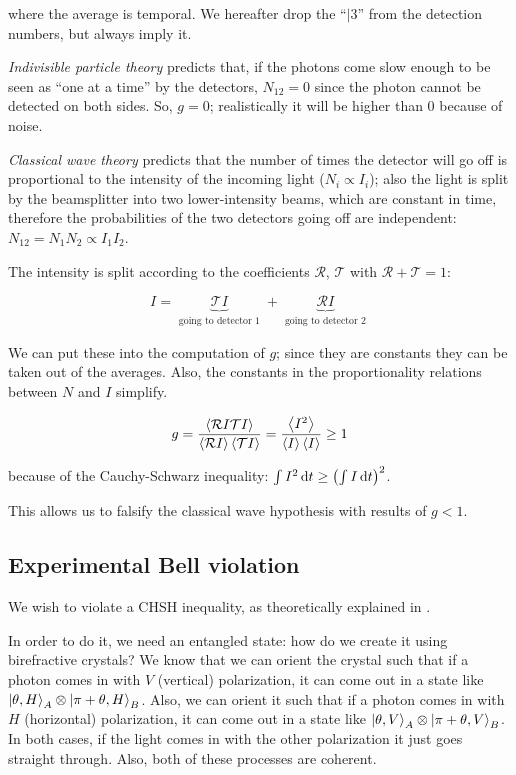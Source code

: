 \documentclass[main.tex]{subfiles}
\begin{document}
where the average is temporal. We hereafter drop the ``\(|3\)'' from the detection numbers, but always imply it.

\emph{Indivisible particle theory} predicts that, if the photons come slow enough to be seen as ``one at a time'' by the detectors, \(N_{12} = 0\) since the photon cannot be detected on both sides. So, \(g=0\); realistically it will be higher than 0 because of noise.

\emph{Classical wave theory} predicts that the number of times the detector will go off is proportional to the intensity of the incoming light (\(N_i \propto I_i\)); also the light is split by the beamsplitter into two lower-intensity beams, which are constant in time, therefore the probabilities of the two detectors going off are independent:  \(N_{12} = N_1 N_2 \propto I_1 I_2\).

The intensity is split according to the coefficients \(\mathcal R\), \(\mathcal T\) with \(\mathcal R + \mathcal T =1\):

\begin{equation}
    I  = \underbrace{\mathcal T I}_{\substack{\text{going to detector 1}}} +
     \underbrace{\mathcal R I}_{\substack{\text{going to detector 2}}}
\end{equation}

We can put these into the computation of \(g\); since they are constants they can be taken out of the averages. Also, the constants in the proportionality relations between \(N\) and \(I\) simplify.

\begin{equation}
    g = \frac{\expval{\mathcal R I \mathcal T I} }{\expval{\mathcal R I}\expval{\mathcal T I}  }
    =\frac{\expval{I^2} }{\expval{I}\expval{I}} \geq 1
\end{equation}

because of the Cauchy-Schwarz inequality: \(\int  I^2 \dd{t} \geq\qty( \int  I \dd{t})^2  \).

This allows us to falsify the classical wave hypothesis with results of \(g<1\).

\subsection{Experimental Bell violation}

We wish to violate a CHSH inequality, as theoretically explained in .

In order to do it, we need an entangled state: how do we create it using birefractive crystals? We know that we can orient the crystal such that if a photon comes in with \(V\) (vertical) polarization, it can come out in a state like \(\ket{\theta, H}_A \otimes \ket{\pi+\theta, H}_B \). Also, we can orient it such that if a photon comes in with \(H\) (horizontal) polarization, it can come out in a state like \(\ket{\theta, V}_A \otimes \ket{\pi+\theta, V}_B \). In both cases, if the light comes in with the other polarization it just goes straight through. Also, both of these processes are coherent.
\end{document}

